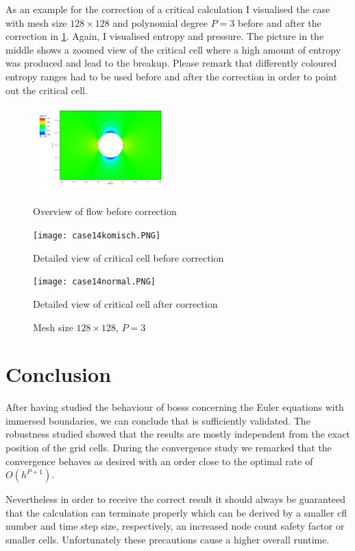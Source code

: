 	As an example for the correction of a critical calculation I visualised the case with mesh size $128 \times 128$ and polynomial degree $P = 3$ before and after the correction in \cref{fig:case14}. Again, I visualised entropy and pressure. The picture in the middle shows a zoomed view of the critical cell where a high amount of entropy was produced and lead to the breakup. Please remark that differently coloured entropy ranges had to be used before and after the correction in order to point out the critical cell.
	\begin{figure}[htp]
		\centering
		\begin{minipage}[b]{0.28\textwidth}
			\centering
			\includegraphics[height=3.3cm]{img/case14.PNG}
			\caption*{Overview of flow before correction}
		\end{minipage}
		\quad
		\begin{minipage}[b]{0.28\textwidth}
			\centering
			\texttt{[image: case14komisch.PNG]}
			\caption*{Detailed view of critical cell before correction}
			\label{fig:case14detail}
		\end{minipage}
		\quad
		\begin{minipage}[b]{0.28\textwidth}
			\centering
			\texttt{[image: case14normal.PNG]}
			\caption*{Detailed view of critical cell after correction}
			\label{fig:case14detailneu}
		\end{minipage}
		\caption{Mesh size $128 \times 128$, $P = 3$}
		\label{fig:case14}
	\end{figure}
	
	\section{Conclusion}
	
	After having studied the behaviour of \gls{bosss} concerning the Euler equations with immersed boundaries, we can conclude that is sufficiently validated. The robustness studied showed that the results are mostly independent from the exact position of the grid cells. During the convergence study we remarked  that the convergence behaves as desired with an order close to the optimal rate of $O(h^{P+1})$. 
	
	Nevertheless in order to receive the correct result it should always be guaranteed that the calculation can terminate properly which can be derived by a smaller \gls{cfl} number and time step size, respectively, an increased node count safety factor or smaller cells. Unfortunately these precautions cause a higher overall runtime.
	
